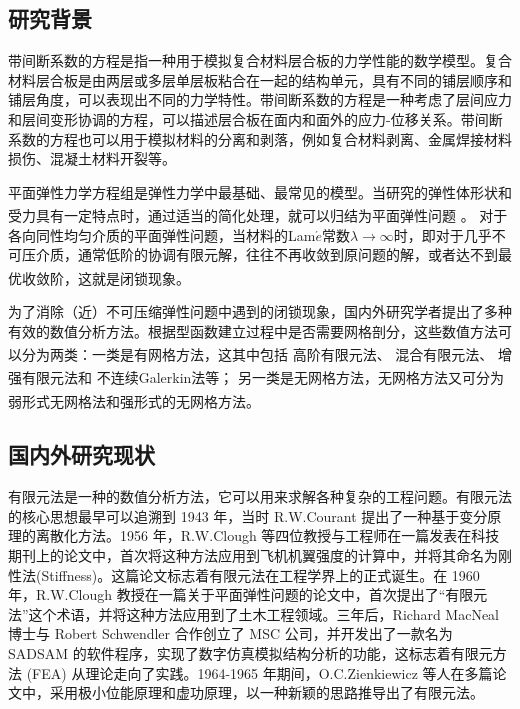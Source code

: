 \documentclass[a4paper,UTF8,titlepage,10pt]{ctexart}
\numberwithin{equation}{subsection}
\begin{document}
\subsection{研究背景}

带间断系数的方程是指一种用于模拟复合材料层合板的力学性能的数学模型。复合材料层合板是由两层或多层单层板粘合在一起的结构单元，具有不同的铺层顺序和铺层角度，可以表现出不同的力学特性。带间断系数的方程是一种考虑了层间应力和层间变形协调的方程，可以描述层合板在面内和面外的应力-位移关系。带间断系数的方程也可以用于模拟材料的分离和剥落，例如复合材料剥离、金属焊接材料损伤、混凝土材料开裂等。

平面弹性力学方程组是弹性力学中最基础、最常见的模型。当研究的弹性体形状和受力具有一定特点时，通过适当的简化处理，就可以归结为平面弹性问题 \textsuperscript{\cite{王兆清2018不可压缩平面问题的位移}}。
对于各向同性均匀介质的平面弹性问题，当材料的Lam$\acute{e}$常数$\lambda \to \infty$时，即对于几乎不可压介质，通常低阶的协调有限元解，往往不再收敛到原问题的解，或者达不到最优收敛阶，这就是闭锁现象\textsuperscript{\cite{陈绍春2007平面弹性的一个新的}}。

为了消除（近）不可压缩弹性问题中遇到的闭锁现象，国内外研究学者提出了多种有效的数值分析方法。根据型函数建立过程中是否需要网格剖分，这些数值方法可以分为两类：一类是有网格方法，这其中包括
高阶有限元法\textsuperscript{\cite{peet2014legendre}}、
混合有限元法\textsuperscript{\cite{masud2011variational}}、
增强有限元法\textsuperscript{\cite{auricchio2005analysis}}和
不连续Galerkin法\textsuperscript{\cite{hansbo2003discontinuous}}等；
另一类是无网格方法，无网格方法又可分为弱形式无网格法和强形式的无网格方法\textsuperscript{\cite{王兆清2018不可压缩平面问题的位移}}。


\subsection{国内外研究现状}

有限元法是一种的数值分析方法，它可以用来求解各种复杂的工程问题。有限元法的核心思想最早可以追溯到 1943 年，当时 R.W.Courant 提出了一种基于变分原理的离散化方法。1956 年，R.W.Clough 等四位教授与工程师在一篇发表在科技期刊上的论文中，首次将这种方法应用到飞机机翼强度的计算中，并将其命名为刚性法(Stiffness)。这篇论文标志着有限元法在工程学界上的正式诞生。在 1960 年，R.W.Clough 教授在一篇关于平面弹性问题的论文中，首次提出了“有限元法”这个术语，并将这种方法应用到了土木工程领域。三年后，Richard MacNeal 博士与 Robert Schwendler 合作创立了 MSC 公司，并开发出了一款名为 SADSAM 的软件程序，实现了数字仿真模拟结构分析的功能，这标志着有限元方法 (FEA) 从理论走向了实践。1964-1965 年期间，O.C.Zienkiewicz 等人在多篇论文中，采用极小位能原理和虚功原理，以一种新颖的思路推导出了有限元法。
\end{document}
